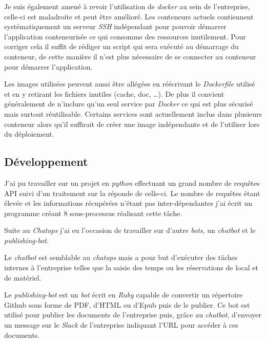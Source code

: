 \bigskip

Je suis également amené à revoir l'utilisation de \emph{docker} au sein
de l'entreprise, celle-ci est maladroite et peut être amélioré. Les
conteneurs actuels contiennent systématiquement un serveur \emph{SSH}
indépendant pour pouvoir démarrer l'application conteneurisée ce qui
consomme des ressources inutilement. Pour corriger cela il suffit de
rédiger un script qui sera exécuté au démarrage du conteneur, de cette
manière il n'est plus nécessaire de se connecter au conteneur pour
démarrer l'application.

\bigskip

Les images utilisées peuvent aussi être allégées en réécrivant le
\emph{Dockerfile} utilisé et en y retirant les fichiers inutiles (cache,
doc, \ldots{}). De plus il convient généralement de n'inclure qu'un seul
service par \emph{Docker} ce qui est plus sécurisé mais surtout
réutilisable. Certains services sont actuellement inclus dans plusieurs
conteneur alors qu'il suffirait de créer une image indépendante et de
l'utiliser lors du déploiement.

\newpage

\subsection{Développement}\label{duxe9veloppement}

\bigskip

J'ai pu travailler sur un projet en \emph{python} effectuant un grand
nombre de requêtes API suivi d'un traitement sur la réponde de celle-ci.
Le nombre de requêtes étant élevée et les informations récupérées
n'étant pas inter-dépendantes j'ai écrit un programme créant 8
sous-processus réalisant cette tâche.

\bigskip

Suite au \emph{Chatops} j'ai eu l'occasion de travailler sur d'autre
\emph{bots}, un \emph{chatbot} et le \emph{publishing-bot}.

\bigskip

Le \emph{chatbot} est semblable au \emph{chatops} mais a pour but
d'exécuter des tâches internes à l'entreprise telles que la saisie des
temps ou les réservations de local et de matériel.

\bigskip

Le \emph{publishing-bot} est un \emph{bot} écrit en \emph{Ruby} capable
de convertir un répertoire Github sous forme de PDF, d'HTML ou d'Epub
puis de le publier. Ce bot est utilisé pour publier les documents de
l'entreprise puis, grâce au \emph{chatbot}, d'envoyer un message sur le
\emph{Slack} de l'entreprise indiquant l'URL pour accéder à ces
documents.

